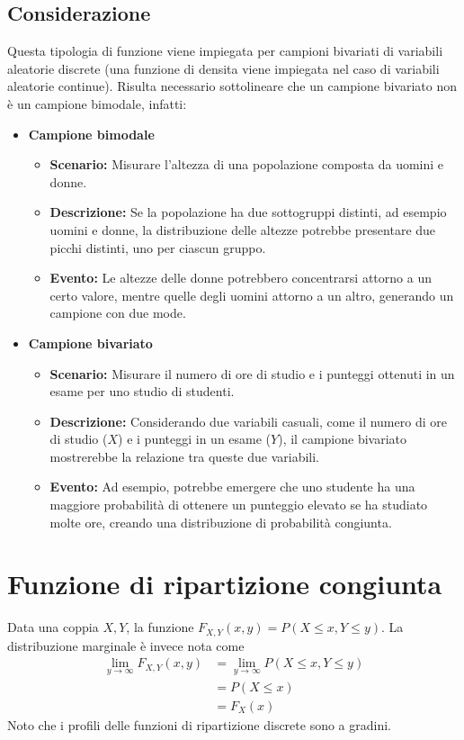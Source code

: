 \documentclass[11pt]{report}
\begin{document}
\subsection{Considerazione}
Questa tipologia di funzione viene impiegata per campioni bivariati di variabili aleatorie discrete (una funzione di densita viene impiegata nel caso di variabili aleatorie continue). Risulta necessario sottolineare che un campione bivariato non è un campione bimodale, infatti:
\begin{itemize}
	\item \textbf{Campione bimodale}
	\begin{itemize}
		\item \textbf{Scenario:} Misurare l'altezza di una popolazione composta da uomini e donne.
		\item \textbf{Descrizione:} Se la popolazione ha due sottogruppi distinti, ad esempio uomini e donne, la distribuzione delle altezze potrebbe presentare due picchi distinti, uno per ciascun gruppo.
		\item \textbf{Evento:} Le altezze delle donne potrebbero concentrarsi attorno a un certo valore, mentre quelle degli uomini attorno a un altro, generando un campione con due mode.
	\end{itemize}
	\item \textbf{Campione bivariato}
	\begin{itemize}
		\item \textbf{Scenario:} Misurare il numero di ore di studio e i punteggi ottenuti in un esame per uno studio di studenti.
		\item \textbf{Descrizione:} Considerando due variabili casuali, come il numero di ore di studio ($X$) e i punteggi in un esame ($Y$), il campione bivariato mostrerebbe la relazione tra queste due variabili.
		\item \textbf{Evento:} Ad esempio, potrebbe emergere che uno studente ha una maggiore probabilità di ottenere un punteggio elevato se ha studiato molte ore, creando una distribuzione di probabilità congiunta.
	\end{itemize}
\end{itemize}

\section{Funzione di ripartizione congiunta}
Data una coppia $X,Y$, la funzione $F_{X,Y}(x,y) = P(X \leq x, Y \leq y)$. La distribuzione marginale è invece nota come
\begin{equation}
    \begin{split}
        \lim_{y \to \infty} F_{X,Y}(x,y) & = \lim_{y \to \infty} P(X \leq x, Y \leq y)\\
        & = P(X \leq x)\\
        & = F_X(x)
    \end{split}
\end{equation}
Noto che i profili delle funzioni di ripartizione discrete sono a gradini.
\end{document}
